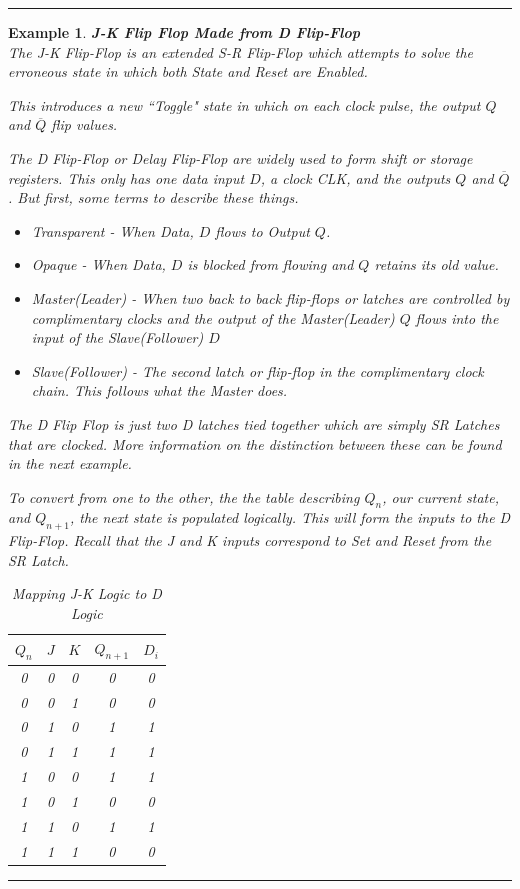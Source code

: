 \documentclass[12pt]{article}
\newtheorem{example}{Example}
\newenvironment{examp}
{
	\vspace{.5cm}
	\hrule
\begin{example}\upshape}
	{\hrule
		\vspace{0.5cm}
\end{example}}
\begin{document}
\begin{examp}
\vspace{.5cm}
\textbf{J-K Flip Flop Made from D Flip-Flop}\\

The \textit{J-K Flip-Flop} is an extended \textit{S-R Flip-Flop} which
attempts to solve the erroneous state in which both State and Reset are
Enabled.

This introduces a new ``Toggle" state in which on each clock pulse, the output
\(Q\) and \(\overline{Q}\) flip values.

The \textit{D Flip-Flop} or \textit{Delay Flip-Flop} are widely used to form
shift or storage registers. This only has one data input \(D\), a clock CLK, and
the outputs \(Q\) and \(\overline{Q}\). But first, some terms to describe
these \textit{things}.
\begin{itemize}
	\item Transparent - When Data, \(D\) flows to Output \(Q\).
	\item Opaque - When Data, \(D\) is blocked from flowing and \(Q\) retains its
	      old value.
	\item Master(Leader) - When two back to back flip-flops or latches are
	      controlled by complimentary clocks and the output of the Master(Leader)
	      \(Q\) flows into the input of the Slave(Follower) \(D\)
	\item Slave(Follower) - The second latch or flip-flop in the complimentary clock
	      chain. This follows what the Master does.
\end{itemize}
The D Flip Flop is just two D latches tied together which are simply SR
Latches that are clocked. More information on the distinction between these can
be found in the next example.

To convert from one to the other, the the table describing \(Q_n\), our
current state, and \(Q_{n+1}\), the next state is populated logically. This
will form the inputs to the D Flip-Flop. Recall that the J and K inputs
correspond to Set and Reset from the SR Latch.

\begin{table}[H]
	\centering
	\begin{tabular}{|c|c|c|c|c|}
		\hline
		\(Q_n\) & \(J\) & \(K\) & \(Q_{n+1}\) & \(D_i\) \\
		\hline
		0       & 0     & 0     & 0           & 0       \\
		0       & 0     & 1     & 0           & 0       \\
		0       & 1     & 0     & 1           & 1       \\
		0       & 1     & 1     & 1           & 1       \\
		1       & 0     & 0     & 1           & 1       \\
		1       & 0     & 1     & 0           & 0       \\
		1       & 1     & 0     & 1           & 1       \\
		1       & 1     & 1     & 0           & 0       \\
		\hline
	\end{tabular}
	\caption{Mapping J-K Logic to D Logic}
\end{table}


\end{examp}
\end{document}
